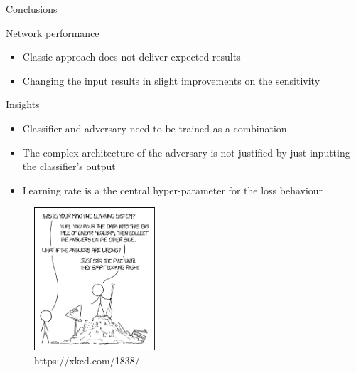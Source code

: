 
\begin{frame}{Conclusions}
    \begin{block}{Network performance}
        \begin{itemize}
            \item Classic approach does not deliver expected results
            \item Changing the input results in slight improvements on the sensitivity
        \end{itemize}
    \end{block}
    \begin{block}{Insights}
        \begin{itemize}
        	\item Classifier and adversary need to be trained as a combination
            \item The complex architecture of the adversary is not justified by just inputting the classifier's output
            \item Learning rate is a the central hyper-parameter for the loss behaviour
        \end{itemize}
    \end{block}
\end{frame}

\begin{frame}{}
    \begin{figure}
        \centering
        \includegraphics[width=0.4\textwidth]{xkcd}
        \caption{https://xkcd.com/1838/}
    \end{figure}
\end{frame}